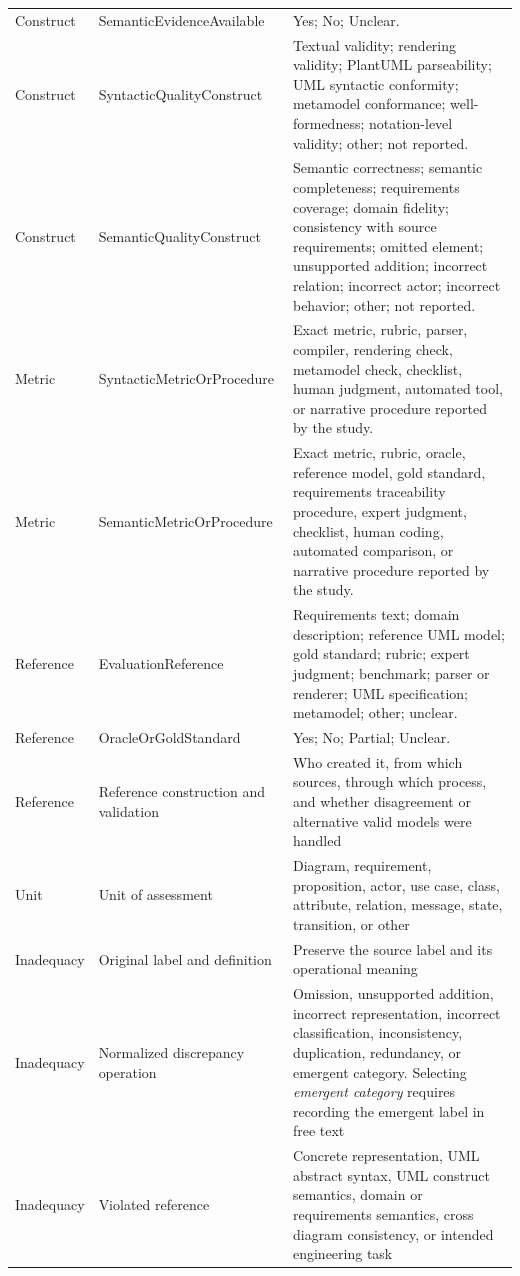 \begin{longtable}{p{} p{} p{}}
Construct & SemanticEvidenceAvailable & Yes; No; Unclear. \\
Construct & SyntacticQualityConstruct & Textual validity; rendering validity; PlantUML parseability; UML syntactic conformity; metamodel conformance; well-formedness; notation-level validity; other; not reported. \\
Construct & SemanticQualityConstruct & Semantic correctness; semantic completeness; requirements coverage; domain fidelity; consistency with source requirements; omitted element; unsupported addition; incorrect relation; incorrect actor; incorrect behavior; other; not reported. \\
Metric & SyntacticMetricOrProcedure & Exact metric, rubric, parser, compiler, rendering check, metamodel check, checklist, human judgment, automated tool, or narrative procedure reported by the study. \\
Metric & SemanticMetricOrProcedure & Exact metric, rubric, oracle, reference model, gold standard, requirements traceability procedure, expert judgment, checklist, human coding, automated comparison, or narrative procedure reported by the study. \\
Reference & EvaluationReference & Requirements text; domain description; reference UML model; gold standard; rubric; expert judgment; benchmark; parser or renderer; UML specification; metamodel; other; unclear. \\
Reference & OracleOrGoldStandard & Yes; No; Partial; Unclear. \\
Reference & Reference construction and validation & Who created it, from which sources, through which process, and whether disagreement or alternative valid models were handled \\
Unit & Unit of assessment & Diagram, requirement, proposition, actor, use case, class, attribute, relation, message, state, transition, or other \\
Inadequacy & Original label and definition & Preserve the source label and its operational meaning \\
Inadequacy & Normalized discrepancy operation & Omission, unsupported addition, incorrect representation, incorrect classification, inconsistency, duplication, redundancy, or emergent category. Selecting \textit{emergent category} requires recording the emergent label in free text \\
Inadequacy & Violated reference & Concrete representation, UML abstract syntax, UML construct semantics, domain or requirements semantics, cross diagram consistency, or intended engineering task \\

\end{longtable}
